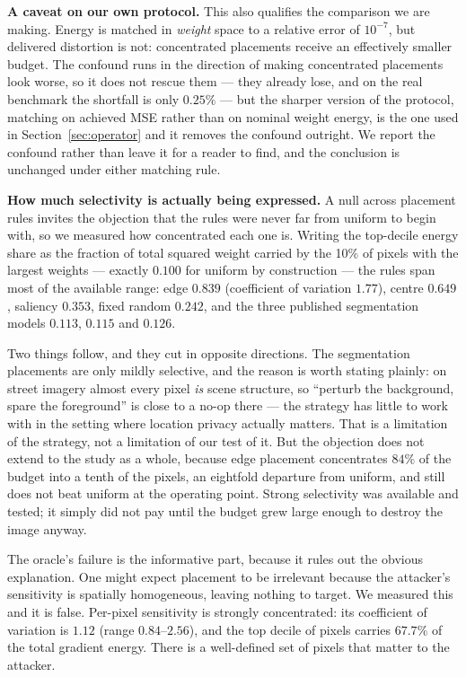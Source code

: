 \documentclass[10pt,journal]{IEEEtran}
\begin{document}
\textbf{A caveat on our own protocol.} This also qualifies the comparison we
are making. Energy is matched in \emph{weight} space to a relative error of
$10^{-7}$, but delivered distortion is not: concentrated placements receive an
effectively smaller budget. The confound runs in the direction of making
concentrated placements look worse, so it does not rescue them --- they
already lose, and on the real benchmark the shortfall is only $0.25\%$ --- but
the sharper version of the protocol, matching on achieved MSE rather than on
nominal weight energy, is the one used in Section~\ref{sec:operator} and it
removes the confound outright. We report the confound rather than leave it for
a reader to find, and the conclusion is unchanged under either matching rule.

\textbf{How much selectivity is actually being expressed.} A null across
placement rules invites the objection that the rules were never far from
uniform to begin with, so we measured how concentrated each one is. Writing
the top-decile energy share as the fraction of total squared weight carried by
the 10\% of pixels with the largest weights --- exactly $0.100$ for uniform by
construction --- the rules span most of the available range: edge $0.839$
(coefficient of variation $1.77$), centre $0.649$, saliency $0.353$, fixed
random $0.242$, and the three published segmentation models $0.113$, $0.115$
and $0.126$.

Two things follow, and they cut in opposite directions. The segmentation
placements are only mildly selective, and the reason is worth stating plainly:
on street imagery almost every pixel \emph{is} scene structure, so ``perturb
the background, spare the foreground'' is close to a no-op there --- the
strategy has little to work with in the setting where location privacy
actually matters. That is a limitation of the strategy, not a limitation of
our test of it. But the objection does not extend to the study as a whole,
because edge placement concentrates $84\%$ of the budget into a tenth of the
pixels, an eightfold departure from uniform, and still does not beat uniform
at the operating point. Strong selectivity was available and tested; it simply
did not pay until the budget grew large enough to destroy the image anyway.

The oracle's failure is the informative part, because it rules out the
obvious explanation. One might expect placement to be irrelevant because the
attacker's sensitivity is spatially homogeneous, leaving nothing to target.
We measured this and it is false. Per-pixel sensitivity is strongly
concentrated: its coefficient of variation is $1.12$ (range $0.84$--$2.56$),
and the top decile of pixels carries $67.7\%$ of the total gradient energy.
There is a well-defined set of pixels that matter to the attacker.
\end{document}
